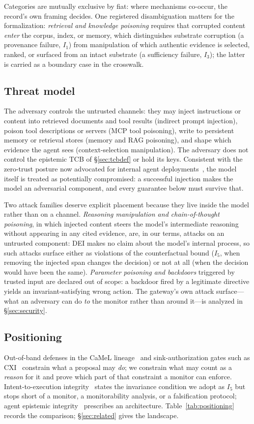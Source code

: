 \documentclass[conference,compsoc]{IEEEtran}
\theoremstyle{definition}
\theoremstyle{plain}
\newcommand{\Ione}{\ensuremath{I_1}}
\newcommand{\Ithree}{\ensuremath{I_3}}
\newcommand{\Ifive}{\ensuremath{I_5}}
\begin{document}
Categories are mutually exclusive by fiat: where mechanisms co-occur,
the record's own framing decides. One registered disambiguation matters
for the formalization: \emph{retrieval and knowledge poisoning} requires
that corrupted content \emph{enter} the corpus, index, or memory, which
distinguishes substrate corruption (a provenance failure, \Ione) from
manipulation of which authentic evidence is selected, ranked, or
surfaced from an intact substrate (a sufficiency failure, \Ithree); the
latter is carried as a boundary case in the crosswalk.

\subsection{Threat model}
\label{sec:threat}
The adversary controls the untrusted channels: they may inject
instructions or content into retrieved documents and tool results
(indirect prompt injection), poison tool descriptions or servers (MCP
tool poisoning), write to persistent memory or retrieval stores
(memory and RAG poisoning), and shape which evidence the agent sees
(context-selection manipulation). The adversary does not control the
epistemic TCB of \S\ref{sec:tcbdef} or hold its keys. Consistent with
the zero-trust posture now advocated for internal agent
deployments~\cite{controlroadmap}, the model itself is treated as
potentially compromised: a successful injection makes the model an
adversarial component, and every guarantee below must survive that.

Two attack families deserve explicit placement because they live inside
the model rather than on a channel. \emph{Reasoning manipulation and
chain-of-thought poisoning}, in which injected content steers the
model's intermediate reasoning without appearing in any cited evidence,
are, in our terms, attacks on an untrusted component: DEI makes no claim
about the model's internal process, so such attacks surface either as
violations of the counterfactual bound (\Ifive, when removing the
injected span changes the decision) or not at all (when the decision
would have been the same). \emph{Parameter poisoning and backdoors}
triggered by trusted input are declared out of scope: a backdoor fired
by a legitimate directive yields an invariant-satisfying wrong action.
The gateway's own attack surface---what an adversary can do \emph{to}
the monitor rather than around it---is analyzed in \S\ref{sec:security}.

\subsection{Positioning}
\label{sec:positioning}
Out-of-band defenses in the CaMeL lineage~\cite{camel,oob} and
sink-authorization gates such as CXI~\cite{cxi} constrain what a
proposal may \emph{do}; we constrain what may count as a \emph{reason}
for it and prove which part of that constraint a monitor can enforce.
Intent-to-execution integrity~\cite{qu} states the invariance
condition we adopt as \Ifive{} but stops short of a monitor, a
monitorability analysis, or a falsification protocol; agent epistemic
integrity~\cite{shen} prescribes an architecture. Table~\ref{tab:positioning}
records the comparison; \S\ref{sec:related} gives the landscape.
\end{document}
